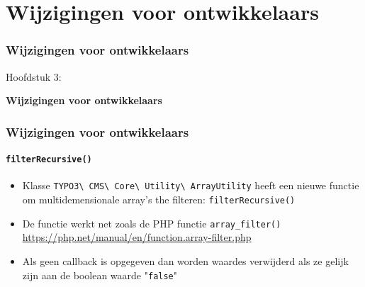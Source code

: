 %

\section{Wijzigingen voor ontwikkelaars}
\begin{frame}[fragile]
	\frametitle{Wijzigingen voor ontwikkelaars}

	\begin{center}\huge{Hoofdstuk 3:}\end{center}
	\begin{center}\huge{\color{typo3darkgrey}\textbf{Wijzigingen voor ontwikkelaars}}\end{center}

\end{frame}


\begin{frame}[fragile]
	\frametitle{Wijzigingen voor ontwikkelaars}
	\framesubtitle{\texttt{filterRecursive()}}

	\begin{itemize}
		\item Klasse
			\texttt{TYPO3\textbackslash
				CMS\textbackslash
				Core\textbackslash
				Utility\textbackslash
				ArrayUtility}\newline
			heeft een nieuwe functie om multidemensionale array's the filteren:\newline
			\texttt{filterRecursive()}
		\item De functie werkt net zoals de PHP functie \texttt{array\_filter()}\newline
			\small
				\href{https://php.net/manual/en/function.array-filter.php}{https://php.net/manual/en/function.array-filter.php}
			\normalsize
		\item Als geen callback is opgegeven dan worden waardes verwijderd als ze gelijk zijn aan de boolean waarde "\texttt{false}"
	\end{itemize}

\end{frame}

